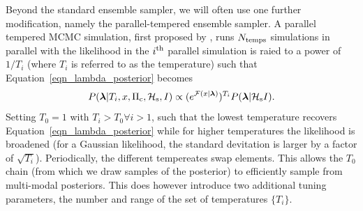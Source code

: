 \documentclass[aps, prd, twocolumn, superscriptaddress, floatfix, showpacs, nofootinbib, longbibliography]{revtex4-1}
\begin{document}
Beyond the standard ensemble sampler, we will often use one further
modification, namely the parallel-tempered ensemble sampler. A parallel
tempered MCMC simulation, first proposed by \citet{swendsen1986}, runs
$N_{\rm temps}$ simulations in parallel with the likelihood in the $i^{\rm th}$
parallel simulation is raied to a power of $1/T_{i}$ (where $T_i$ is referred
to as the temperature) such that Equation~\eqref{eqn_lambda_posterior} becomes
\begin{equation}
P(\boldsymbol{\mathbf{\lambda}} | T_i, x, \Pi_{\rm c}, \mathcal{H}_{\rm s}, I)
\propto (e^{{\mathcal{F}}(x| \boldsymbol{\mathbf{\lambda}})})^{T_i} P(\boldsymbol{\mathbf{\lambda}}| \mathcal{H}_{\rm s} I).
\end{equation}
Setting $T_0=1$ with $T_i > T_0 \forall i > 1$, such that the lowest
temperature recovers Equation~\eqref{eqn_lambda_posterior} while for higher
temperatures the likelihood is broadened (for a Gaussian likelihood, the
standard devitation is larger by a factor of $\sqrt{T_i}$). Periodically, the
different tempereates swap elements. This allows the $T_0$ chain (from which we
draw samples of the posterior) to efficiently sample from multi-modal
posteriors. This does however introduce two additional tuning parameters, the
number and range of the set of temperatures $\{T_i\}$.
\end{document}
